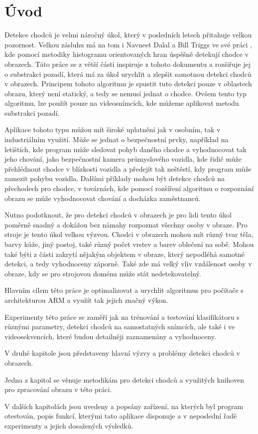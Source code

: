 \section{Úvod}
Detekce chodců je velmi náročný úkol, který v posledních letech přitahuje velkou pozornost. Velkou zásluhu má na tom i Navneet Dalal a Bill Triggs ve své práci \cite{hog:dalal}, kde pomocí metodiky histogramu orientovaných hran úspěšně detekují chodce v obrazech. Táto práce se z větší části inspiruje z tohoto dokumentu a rozšiřuje jej o substrakci pozadí, která má za úkol urychlit a zlepšit samotnou detekci chodců v obrazech.  Principem tohoto algoritmu je spustit tuto detekci pouze v oblastech obrazu, který není statický, a tedy se nemusí jednat o chodce. Ovšem tento typ algoritmu, lze použít pouze na videosnímcích, kde můžeme aplikovat metodu substrakci pozadí.

Aplikace tohoto typu můžou mít široké uplatnění jak v osobním, tak v industriálním využití. Může se jednat o bezpečnostní prvky, například na letištích, kde program může sledovat pohyb daného chodce a vyhodnocovat tak jeho chování, jako bezpečnostní kamera průmyslového vozidla, kde řidič může přehlédnout chodce v blízkosti vozidla a předejít tak neštěstí, kdy program může zamezit pohybu vozidla. Dalšími příklady mohou být detekce chodců na přechodech pro chodce, v továrnách, kde pomocí rozšíření algoritmu o rozpoznání obrazu se může vyhodnocovat chování a docházka zaměstnanců. 

Nutno podotknout, že pro detekci chodců v obrazech je pro lidi tento úkol poměrně snadný a dokážou bez námahy rozpoznat všechny osoby v obraze. Pro stroje je tento úkol velkou výzvou. Chodci v obrazech mohou mít různý tvar těla, barvy kůže, jiný postoj, také různý počet vrstev a barev oblečení na sobě. Mohou také býti z části zakrytí nějakým objektem v obraze, který nepodléhá samotné detekci, a tedy vyhodnoceny záporně. Také zde má velký vliv vzdálenost osoby v obraze, kdy se pro strojovou doménu může stát nedetekovatelný. 

Hlavním cílem této práce je optimalizovat a urychlit algoritmus pro počítače s architekturou ARM a využít tak jejich značný výkon. 

Experimenty této práce se zaměří jak na trénování a testování klasifikátoru s různými parametry, detekci chodců na samostatných snímcích, ale také i ve videosekvencích, které budou detailněji zaznamenány a vyhodnoceny. 

V druhé kapitole jsou představeny hlavní výzvy a problémy detekci chodců v obrazech.

Jedna z kapitol se věnuje metodikám pro detekci chodců a využitých knihoven pro zpracování obrazu v této práci. 

V dalších kapitolách jsou uvedeny a popsány zařízení, na kterých byl program otestován, popis funkcí, kterými tato aplikace disponuje a v neposlední řadě experimenty a jejich dosažených výsledků. 